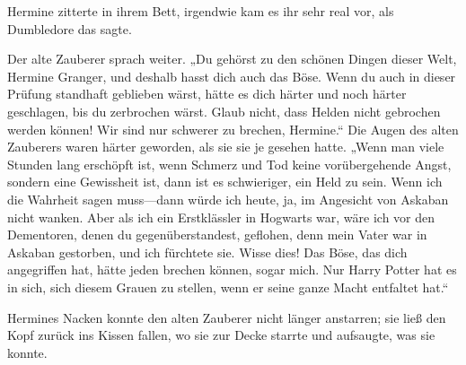 Hermine zitterte in ihrem Bett, irgendwie kam es ihr sehr real vor, als Dumbledore das sagte.

Der alte Zauberer sprach weiter. „Du gehörst zu den schönen Dingen dieser Welt, Hermine Granger, und deshalb hasst dich auch das Böse. Wenn du auch in dieser Prüfung standhaft geblieben wärst, hätte es dich härter und noch härter geschlagen, bis du zerbrochen wärst. Glaub nicht, dass Helden nicht gebrochen werden können! Wir sind nur schwerer zu brechen, Hermine.“ Die Augen des alten Zauberers waren härter geworden, als sie sie je gesehen hatte. „Wenn man viele Stunden lang erschöpft ist, wenn Schmerz und Tod keine vorübergehende Angst, sondern eine Gewissheit ist, dann ist es schwieriger, ein Held zu sein. Wenn ich die Wahrheit sagen muss—dann würde ich heute, ja, im Angesicht von Askaban nicht wanken. Aber als ich ein Erstklässler in Hogwarts war, wäre ich vor den Dementoren, denen du gegenüberstandest, geflohen, denn mein Vater war in Askaban gestorben, und ich fürchtete sie. Wisse dies! Das Böse, das dich angegriffen hat, hätte jeden brechen können, sogar mich. Nur Harry Potter hat es in sich, sich diesem Grauen zu stellen, wenn er seine ganze Macht entfaltet hat.“

Hermines Nacken konnte den alten Zauberer nicht länger anstarren; sie ließ den Kopf zurück ins Kissen fallen, wo sie zur Decke starrte und aufsaugte, was sie konnte.


